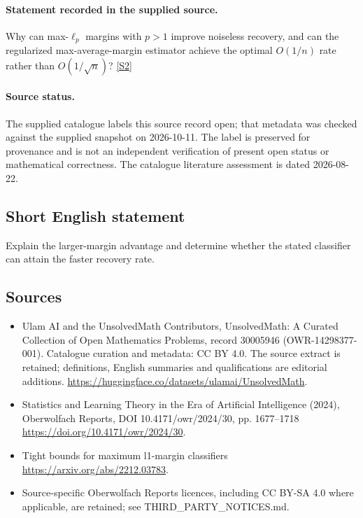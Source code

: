 \documentclass[11pt]{article}
\begin{document}
\paragraph{Statement recorded in the supplied source.}
Why can max-$\ell_p$ margins with $p>1$ improve noiseless recovery, and can the regularized max-average-margin estimator achieve the optimal $O(1/n)$ rate rather than $O(1/\sqrt n)$? \href{https://doi.org/10.4171/owr/2024/30}{[S2]}
\paragraph{Source status.}
The supplied catalogue labels this source record open; that metadata was checked against the supplied snapshot on 2026-10-11. The label is preserved for provenance and is not an independent verification of present open status or mathematical correctness. The catalogue literature assessment is dated 2026-08-22.
\subsection{Short English statement}
Explain the larger-margin advantage and determine whether the stated classifier can attain the faster recovery rate.
\subsection{Sources}
\begin{itemize}
\item[S1] Ulam AI and the UnsolvedMath Contributors, UnsolvedMath: A Curated Collection of Open Mathematics Problems, record 30005946 (OWR-14298377-001). Catalogue curation and metadata: CC BY 4.0. The source extract is retained; definitions, English summaries and qualifications are editorial additions.
\url{https://huggingface.co/datasets/ulamai/UnsolvedMath}.
\item[S2] Statistics and Learning Theory in the Era of Artificial Intelligence (2024), Oberwolfach Reports, DOI 10.4171/owr/2024/30, pp. 1677--1718
\url{https://doi.org/10.4171/owr/2024/30}.
\item[S3] Tight bounds for maximum l1-margin classifiers
\url{https://arxiv.org/abs/2212.03783}.
\item Source-specific Oberwolfach Reports licences, including CC BY-SA 4.0 where applicable, are retained; see THIRD\_PARTY\_NOTICES.md.
\end{itemize}
\end{document}
